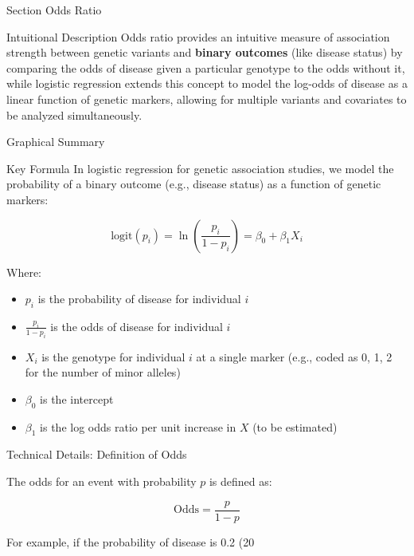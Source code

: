 
\begin{frame}{Section}
\centering
\Huge{Odds Ratio}
\end{frame}


\begin{frame}{Intuitional Description}
Odds ratio provides an intuitive measure of association strength between genetic variants and \textbf{binary outcomes} (like disease status) by comparing the odds of disease given a particular genotype to the odds without it, while logistic regression extends this concept to model the log-odds of disease as a linear function of genetic markers, allowing for multiple variants and covariates to be analyzed simultaneously.
\end{frame}

\begin{frame}{Graphical Summary}

\end{frame}


\begin{frame}{Key Formula}
In logistic regression for genetic association studies, we model the probability of a binary outcome (e.g., disease status) as a function of genetic markers:

$$
\text{logit}(p_i) = \ln\left(\frac{p_i}{1-p_i}\right) = \beta_0 + \beta_1 X_i
$$

Where:
\begin{itemize}
\item $p_i$ is the probability of disease for individual $i$
\item $\frac{p_i}{1-p_i}$ is the odds of disease for individual $i$
\item $X_i$ is the genotype for individual $i$ at a single marker (e.g., coded as 0, 1, 2 for the number of minor alleles)
\item $\beta_0$ is the intercept
\item $\beta_1$ is the log odds ratio per unit increase in $X$ (to be estimated)
\end{itemize}

\end{frame}


\begin{frame}{Technical Details: Definition of Odds}

The odds for an event with probability $p$ is defined as:

$$
\text{Odds} = \frac{p}{1-p}
$$

For example, if the probability of disease is 0.2 (20%

\end{frame}

